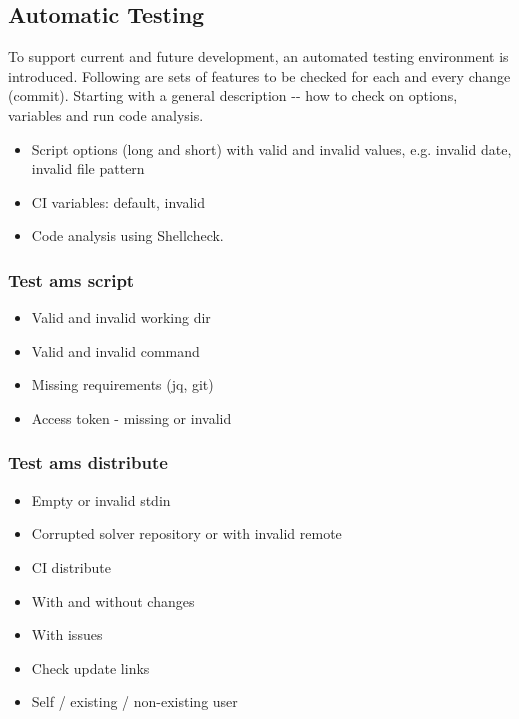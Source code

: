 \subsection{Automatic Testing}\label{ssec:autotest}

{To support current and future development, an automated testing environment is introduced. Following are sets of features to be checked for each and every change (commit). Starting with a general description -\/- how to check on options, variables and run code analysis.}

\begin{itemize}
\item
  {Script options (long and short) with valid and invalid values, e.g. invalid date, invalid file pattern}
\item
  {CI variables: default, invalid}
\item
  {Code analysis using Shellcheck.}
\end{itemize}

\subsubsection{Test ams script}

\begin{itemize}
\item
  {Valid and invalid working dir}
\item
  {Valid and invalid command}
\item
  {Missing requirements (jq, git)}
\item
  {Access token - missing or invalid}
\end{itemize}

\subsubsection{Test ams distribute}

\begin{itemize}
\item
  {Empty or invalid stdin}
\item
  {Corrupted solver repository or with invalid remote}
\item
  {CI distribute}
\end{itemize}

\begin{itemize}
\item
  {With and without changes}
\item
  {With issues}
\item
  {Check update links}
\item
  {Self / existing / non-existing user}
\end{itemize}

